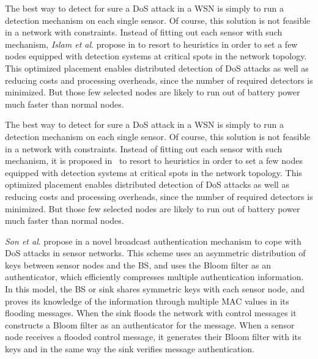 The best way to detect for sure a DoS attack in a WSN is simply to run a detection mechanism on each single sensor.
Of course, this solution is not feasible in a network with constraints.
Instead of fitting out each sensor with such mechanism, \textit{Islam et al}. propose in
\cite{INK09}
to resort to heuristics in order to set a few nodes equipped with detection systems at critical spots in the network topology.
This optimized placement enables distributed detection of DoS attacks as well as reducing costs and processing overheads, since the number of required detectors is minimized.
But those few selected nodes are likely to run out of battery power much faster than normal nodes.


The best way to detect for sure a DoS attack in a WSN is simply to run a detection mechanism on each single sensor.
Of course, this solution is not feasible in a network with constraints.
Instead of fitting out each sensor with such mechanism, it is proposed in~\cite{INK09} to resort to heuristics in order to set a few nodes equipped with detection systems at critical spots in the network topology.
This optimized placement enables distributed detection of DoS attacks as well as reducing costs and processing overheads, since the number of required detectors is minimized.
But those few selected nodes are likely to run out of battery power much faster than normal nodes.



\textit{Son et al}. propose in
\cite{JS10}
a novel broadcast authentication mechanism to cope with DoS attacks in sensor networks.
This scheme uses an asymmetric distribution of keys between sensor nodes and the BS, and uses the Bloom filter as an authenticator, which efficiently compresses multiple authentication information.
In this model, the BS or sink shares symmetric keys with each sensor node, and proves its knowledge of the information through multiple MAC values in its flooding messages.
When the sink floods the network with control messages it constructs a Bloom filter as an authenticator for the message.
When a sensor node receives a flooded control message, it generates their Bloom filter with its keys and in the same way the sink verifies message authentication.

